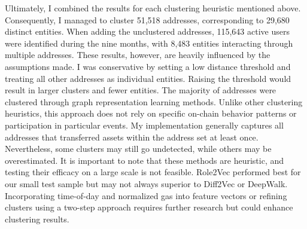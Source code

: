 \documentclass[12pt,a4paper,titlepage,oneside,english]{article}
\begin{document}
Ultimately, I combined the results for each clustering heuristic mentioned above. Consequently, I managed to cluster 51,518 addresses, corresponding to 29,680 distinct entities. When adding the unclustered addresses, 115,643 active users were identified during the nine months, with 8,483 entities interacting through multiple addresses. \newline
These results, however, are heavily influenced by the assumptions made. I was conservative by setting a low distance threshold and treating all other addresses as individual entities. Raising the threshold would result in larger clusters and fewer entities. \newline 
The majority of addresses were clustered through graph representation learning methods. Unlike other clustering heuristics, this approach does not rely on specific on-chain behavior patterns or participation in particular events. My implementation generally captures all addresses that transferred assets within the address set at least once. Nevertheless, some clusters may still go undetected, while others may be overestimated. It is important to note that these methods are heuristic, and testing their efficacy on a large scale is not feasible. \newline
Role2Vec performed best for our small test sample but may not always superior to Diff2Vec or DeepWalk. Incorporating time-of-day and normalized gas into feature vectors or refining clusters using a two-step approach requires further research but could enhance clustering results.

\end{document}
